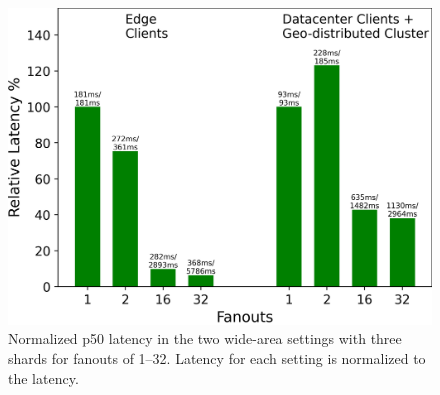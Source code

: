 \begin{figure}[tbp]
\centering
  \includegraphics[width=.9\columnwidth]{figs/wan/wide_area_latencies.png}
\caption{Normalized p50 latency in the two wide-area settings with three shards for fanouts of 1--32. Latency for each setting is normalized to the \mpaxos{} latency.}
\label{fig:wan}
\end{figure}




